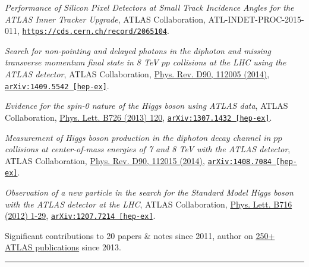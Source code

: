 \documentclass{letter}
\begin{document}
\textit{Performance of Silicon Pixel Detectors at Small Track Incidence Angles for the ATLAS Inner Tracker Upgrade}, ATLAS Collaboration, ATL-INDET-PROC-2015-011, \href{https://cds.cern.ch/record/2065104}{\texttt{https://cds.cern.ch/record/2065104}}.

\textit{Search for non-pointing and delayed photons in the diphoton and missing transverse momentum final state in 8 TeV $pp$ collisions at the LHC using the ATLAS detector}, ATLAS Collaboration, 
\href{http://journals.aps.org/prd/abstract/10.1103/PhysRevD.90.112005}{Phys. Rev. D90, 112005 (2014)}, \href{https://arxiv.org/abs/1409.5542}{\texttt{arXiv:1409.5542 [hep-ex]}}.

\textit{Evidence for the spin-0 nature of the Higgs boson using ATLAS data}, ATLAS Collaboration, \href{http://www.sciencedirect.com/science/article/pii/S0370269313006527?np=y}{Phys. Lett. B726 (2013) 120}, \href{https://arxiv.org/abs/1307.1432}{\texttt{arXiv:1307.1432 [hep-ex]}}.

\textit{Measurement of Higgs boson production in the diphoton decay channel in $pp$ collisions at center-of-mass energies of 7 and 8 TeV with the ATLAS detector}, ATLAS Collaboration, \href{http://journals.aps.org/prd/abstract/10.1103/PhysRevD.90.112015}{Phys. Rev. D90, 112015 (2014)}, \href{http://arxiv.org/abs/1408.7084}{\texttt{arXiv:1408.7084 [hep-ex]}}.

\textit{Observation of a new particle in the search for the Standard Model Higgs boson with the ATLAS detector at the LHC}, ATLAS Collaboration, \href{http://www.sciencedirect.com/science/article/pii/S037026931200857X}{Phys. Lett. B716 (2012) 1-29}, \href{https://arxiv.org/abs/1207.7214}{\texttt{arXiv:1207.7214 [hep-ex]}}.

\begin{flushright}
Significant contributions to 20 papers \& notes since 2011, author on \href{https://twiki.cern.ch/twiki/bin/view/AtlasPublic}{250+ ATLAS publications} since 2013.\\
\end{flushright}

\begin{flushleft}
\Large{\textsc{\textbf{\color{Maroon}{Conference Presentations}}}}
\vspace{1pt} %
\hrule
\end{flushleft}
\end{document}
